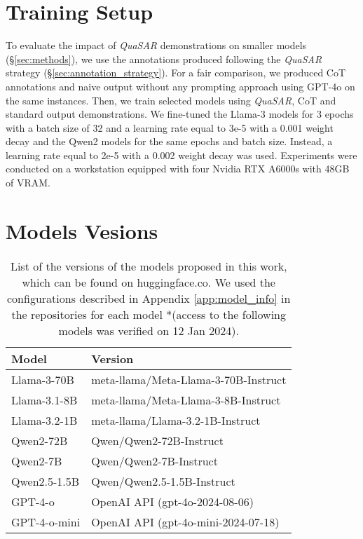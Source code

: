 \documentclass[11pt]{article}
\newcommand{\QuaSAR}{\emph{QuaSAR}\xspace}
\begin{document}
\begin{table}[]
\section{Training Setup}
\label{app:tuning_configuration}
To evaluate the impact of \QuaSAR demonstrations on smaller models (\S \ref{sec:methods}), we use the annotations produced following the \QuaSAR strategy (\S \ref{sec:annotation_strategy}). For a fair comparison, we produced CoT annotations and naive output without any prompting approach using GPT-4o on the same instances. Then, we train selected models using \QuaSAR, CoT and standard output demonstrations. 
We fine-tuned the Llama-3 models for 3 epochs with a batch size of 32 and a learning rate equal to 3e-5 with a 0.001 weight decay and the Qwen2 models for the same epochs and batch size. Instead, a learning rate equal to 2e-5 with a 0.002 weight decay was used. Experiments were conducted on a workstation equipped with four Nvidia RTX A6000s with 48GB of VRAM.

\vspace{1cm}

\section{Models Vesions}
\label{app:model_versions}
\small
\centering 
\begin{tabular}{p{}|p{4.6cm}}
\textbf{Model} & \textbf{Version}  \\ 
\toprule
Llama-3-70B   &  meta-llama/Meta-Llama-3-70B-Instruct \\
Llama-3.1-8B   &  meta-llama/Meta-Llama-3-8B-Instruct \\
Llama-3.2-1B   &  meta-llama/Llama-3.2-1B-Instruct \\ 
\hline
Qwen2-72B   & Qwen/Qwen2-72B-Instruct  \\
Qwen2-7B   & Qwen/Qwen2-7B-Instruct  \\
Qwen2.5-1.5B   & Qwen/Qwen2.5-1.5B-Instruct  \\
\hline
GPT-4-o & OpenAI API (gpt-4o-2024-08-06)  \\
GPT-4-o-mini & OpenAI API (gpt-4o-mini-2024-07-18)  \\
\hline

\end{tabular}

\caption{List of the versions of the models proposed in this work, which can be found on huggingface.co. We used the configurations described in Appendix \ref{app:model_info} in the repositories for each model *(access to the following models was verified on 12 Jan 2024).}
\label{tab:versions_models}
\end{table}
\end{document}
